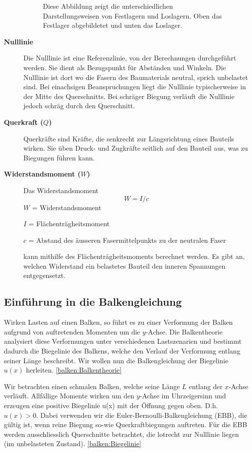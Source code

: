 \begin{description}
\begin{figure} [h]
\caption{Diese Abbildung zeigt die unterschiedlichen Darstellungsweisen von Festlagern und Loslagern. Oben das Festlager abgebildetet und unten das Loslager.}
\label{fig:Diese Abbildung zeigt die unterschiedlichen Darstellungsweisen von Festlagern und Loslagern. Oben das Festlager abgebildetet und unten das Loslager.}
\end{figure}
\item[\textbf{Nulllinie}] Die Nulllinie ist eine Referenzlinie, von der Berechnungen durchgeführt werden. Sie dient als Bezugspunkt für Abständen und Winkeln.
Die Nulllinie ist dort wo die Fasern des Baumaterials neutral, sprich unbelastet sind.
Bei einachsigen Beanspruchungen liegt die Nulllinie typischerweise in der Mitte des Querschnitts.
Bei schräger Biegung verläuft die Nulllinie jedoch schräg durch den Querschnitt.
\item[\textbf{Querkraft ($Q$)}] Querkräfte sind Kräfte, die senkrecht zur Längsrichtung eines Bauteils wirken.
Sie üben Druck- und Zugkräfte seitlich auf den Bauteil aus, was zu Biegungen führen kann.
\item[\textbf{Widerstandsmoment ($W$)}] Das Widerstandsmoment
\begin{equation}
W=I/c
\end{equation}
$W$ = Widerstandsmoment

$I$ = Flächenträgheitsmoment

$c$ = Abstand des äusseren Fasermittelpunkts zu der neutralen Faser

kann mithilfe des Flächenträgheitsmoments berechnet werden.
Es gibt an, welchen Widerstand ein belastetes Bauteil den inneren Spannungen entgegensetzt.
\end{description}
\subsection{Einführung in die Balkengleichung}
Wirken Lasten auf einen Balken, so führt es zu einer Verformung der Balken aufgrund von auftretenden Momenten um die $y$-Achse.
Die Balkentheorie analysiert diese Verformungen unter verschiedenen Lastszenarien und bestimmt dadurch die Biegelinie des Balkens, welche den Verlauf der Verformung entlang seiner Länge beschreibt.
Wir wollen nun die Balkengleichung der Biegelinie $u(x)$ herleiten. \ref{balken:Balkentheorie}

Wir betrachten einen schmalen Balken, welche seine Länge $L$ entlang der $x$-Achse verläuft.
Allfällige Momente wirken um den $y$-Achse im Uhrzeigersinn und erzeugen eine positive Biegelinie u(x) mit der Öffnung gegen oben.
D.h. $u(x) > 0$.
Dabei verwenden wir die Euler-Bernoulli-Balkengleichung (EBB), die gültig ist, wenn reine Biegung so-wie Querkraftbiegungen auftreten.
Für die EBB werden ausschliesslich Querschnitte betrachtet, die lotrecht zur Nulllinie liegen (im unbelasteten Zustand). \ref{balken:Biegelinie}